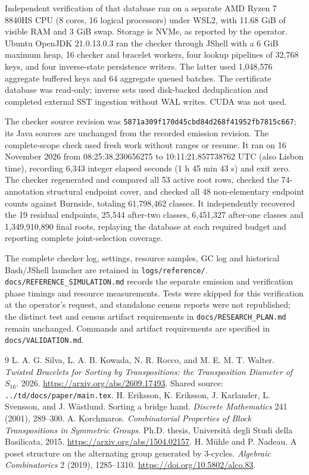 \documentclass[11pt,a4paper]{article}
\begin{document}
Independent verification of that database ran on a separate AMD Ryzen 7
8840HS CPU (8 cores, 16 logical processors) under WSL2, with 11.68 GiB of
visible RAM and 3 GiB swap. Storage is NVMe, as reported by the operator.
Ubuntu OpenJDK 21.0.13.0.3 ran the checker through JShell with a 6 GiB maximum
heap, 16 checker and bracelet workers, four lookup pipelines of 32,768 keys,
and four inverse-state persistence writers. The latter used 1,048,576 aggregate
buffered keys and 64 aggregate queued batches. The certificate database was
read-only; inverse sets used disk-backed deduplication and completed external
SST ingestion without WAL writes. CUDA was not used.

The checker source revision was
\nolinkurl{5871a309f170d45cbd84d268f41952fb7815c667}; its Java sources are
unchanged from the recorded emission revision. The complete-scope check used
fresh work without ranges or resume. It ran on 16 November 2026 from
08:25:38.230656275 to 10:11:21.857738762 UTC (also Lisbon time), recording
6,343 integer elapsed seconds (1 h 45 min 43 s) and exit zero.
The checker regenerated and compared all 53 active root rows, checked the
74-annotation structural endpoint cover, and checked all 48 non-elementary
endpoint counts against Burnside, totaling 61,798,462 classes. It independently
recovered the 19 residual endpoints, 25,544 after-two classes, 6,451,327
after-one classes and 1,349,910,890 final roots, replaying the database at each
required budget and reporting complete joint-selection coverage.

The complete checker log, settings, resource samples, GC log and historical
Bash/JShell launcher are retained in \nolinkurl{logs/reference/}.
\nolinkurl{docs/REFERENCE_SIMULATION.md} records the separate emission and
verification phase timings and resource measurements. Tests were skipped
for this verification at the operator's request, and standalone census
reports were not republished; the distinct test and census artifact
requirements in \nolinkurl{docs/RESEARCH_PLAN.md} remain unchanged.
Commands and artifact requirements are specified in
\nolinkurl{docs/VALIDATION.md}.

\begin{thebibliography}{9}
L. A. G. Silva, L. A. B. Kowada, N. R. Rocco, and M. E. M. T. Walter.
\emph{Twisted Bracelets for Sorting by Transpositions: the Transposition
Diameter of $S_{16}$}. 2026.
\url{https://arxiv.org/abs/2609.17493}.
Shared source: \nolinkurl{../td/docs/paper/main.tex}.
H. Eriksson, K. Eriksson, J. Karlander, L. Svensson, and J. W\"astlund.
Sorting a bridge hand. \emph{Discrete Mathematics} 241 (2001), 289--300.
A. Korchmaros. \emph{Combinatorial Properties of Block Transpositions in
Symmetric Groups}. Ph.D. thesis, Universit\`a degli Studi della Basilicata,
2015. \url{https://arxiv.org/abs/1504.02157}.
H. M\"uhle and P. Nadeau. A poset structure on the alternating group
generated by $3$-cycles. \emph{Algebraic Combinatorics} 2 (2019), 1285--1310.
\url{https://doi.org/10.5802/alco.83}.
\end{thebibliography}
\end{document}

